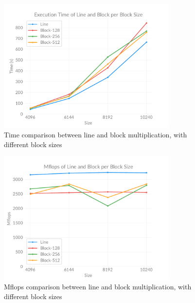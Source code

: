     \begin{figure}[h]
        \centering
        \captionsetup{justification=centering, margin=2cm}
        \includegraphics[width=0.8\textwidth]{pdf/line-block-time}
        \caption{Time comparison between line and block multiplication, with different block sizes}
        \label{fig:chart:line-block-time}
    \end{figure}

    \begin{figure}[h]
        \centering
        \captionsetup{justification=centering, margin=2cm}
        \includegraphics[width=0.8\textwidth]{pdf/line-block-flops}
        \caption{Mflops comparison between line and block multiplication, with different block sizes}
        \label{fig:chart:line-block-flops}
    \end{figure}

